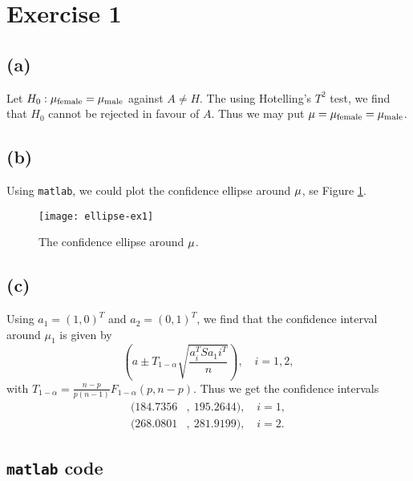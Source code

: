 \section*{Exercise 1}

\subsection*{(a)}
\label{sec:a}

Let $H_0: \mu_{\rm female}= \mu_{\rm male}$ against $A \neq H$. The
using Hotelling's $T^2$ test, we find that $H_0$ cannot be rejected in
favour of $A$. Thus we may put $\mu = \mu_{\rm female} = \mu_{\rm male}$.

\subsection*{(b)}
\label{sec:b}

Using \texttt{matlab}, we could plot the confidence ellipse around
${\bf \mu}$, se Figure \ref{fig:ex1-ellipse}.
\begin{figure}[h]
  \centering
  \texttt{[image: ellipse-ex1]}
  \caption{The confidence ellipse around ${\bf \mu}$.}
  \label{fig:ex1-ellipse}
\end{figure}

\subsection*{(c)}
\label{sec:c}

Using $a_1 = (1,0)^T$ and $a_2 = (0,1)^T$, we find that the confidence
interval around $\mu_1$ is given by
\begin{equation*}
  \left(
    a \pm T_{1-\alpha} \sqrt{\frac{a_i^T S a_1i^T}{n}}
  \right), \quad i = 1,2,
\end{equation*}
with $T_{1-\alpha} = \frac{n-p}{p(n-1)}F_{1-\alpha}(p, n-p)$. Thus we
get the confidence intervals
\begin{align*}
  (184.7356&,\ 195.2644),\quad i = 1, \\
  (268.0801&,\ 281.9199),\quad i = 2.
\end{align*}

\subsection*{\texttt{matlab} code}


